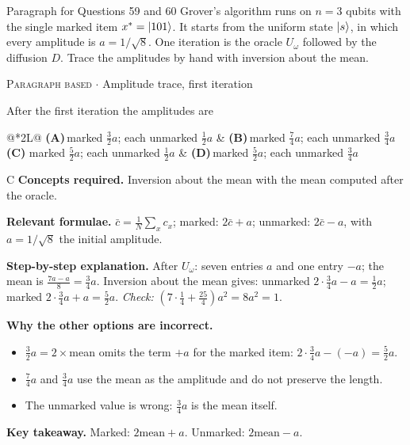 \documentclass[11pt,a4paper]{article}
\newcommand{\optlabel}[1]{\textbf{(#1)}}
\newcommand{\correctlabel}[1]{\textcolor{okgreen}{\textbf{(#1)}\,\ding{51}}}
\newenvironment{qitem}[1]{\begin{list}{}{\setlength{\leftmargin}{3.3em}\setlength{\labelwidth}{3.1em}%
  \setlength{\labelsep}{0.2em}\setlength{\topsep}{3pt}\setlength{\parsep}{3pt}}\item[\textbf{Q.#1}\hfill]}{\end{list}}
\newcommand{\qsep}{\par\vspace{2pt}{\color{black!15}\hrule}\vspace{4pt}}
\newcommand{\qmeta}[2]{{\footnotesize\color{black!60}\textsc{#1} \;$\cdot$\; #2}\par}
\begin{document}
\begin{passagebox}{Paragraph for Questions 59 and 60}
Grover's algorithm runs on $n = 3$ qubits with the single marked item $x^\ast = \ket{101}$. It starts from the uniform state $\ket{s}$, in which every
amplitude is $a = 1/\sqrt8$. One iteration is the oracle $U_\omega$ followed by the diffusion $D$. Trace the amplitudes by hand with inversion about the mean.
\end{passagebox}
\begin{qitem}{59}
\qmeta{Paragraph based}{Amplitude trace, first iteration}
After the first iteration the amplitudes are
\par\smallskip\noindent\begin{tabularx}{\linewidth}{@{}*{2}{L}@{}}
\optlabel{A}\,marked $\frac32a$; each unmarked $\frac12a$ & \optlabel{B}\,marked $\frac74a$; each unmarked $\frac34a$ \\[3pt]
\correctlabel{C}\,marked $\frac52a$; each unmarked $\frac12a$ & \optlabel{D}\,marked $\frac52a$; each unmarked $\frac34a$
\end{tabularx}
\end{qitem}
\begin{solbox}{C}
\textbf{\color{brand}Concepts required.} Inversion about the mean with the mean computed after the oracle.

\textbf{\color{brand}Relevant formulae.} $\bar c = \frac1N\sum_xc_x$; marked: $2\bar c + a$; unmarked: $2\bar c - a$, with $a = 1/\sqrt8$ the initial amplitude.

\textbf{\color{brand}Step-by-step explanation.} After $U_\omega$: seven entries $a$ and one entry $-a$; the mean is $\frac{7a - a}{8} = \frac34a$. Inversion about the mean gives: unmarked $2\cdot\frac34a - a = \frac12a$; marked $2\cdot\frac34a + a = \frac52a$.
\emph{Check:} $(7\cdot\frac14 + \frac{25}{4})a^2 = 8a^2 = 1$.

\textbf{\color{brand}Why the other options are incorrect.}
\begin{itemize}[leftmargin=2.4em, itemsep=1pt, topsep=2pt]
\item[\textbf{(A)}] $\frac32a = 2\times$mean omits the term $+a$ for the marked item: $2\cdot\frac34a - (-a) = \frac52a$.
\item[\textbf{(B)}] $\frac74a$ and $\frac34a$ use the mean as the amplitude and do not preserve the length.
\item[\textbf{(D)}] The unmarked value is wrong: $\frac34a$ is the mean itself.
\end{itemize}
\textbf{\color{brand}Key takeaway.} Marked: $2\text{mean} + a$. Unmarked: $2\text{mean} - a$.
\end{solbox}
\qsep
\end{document}
